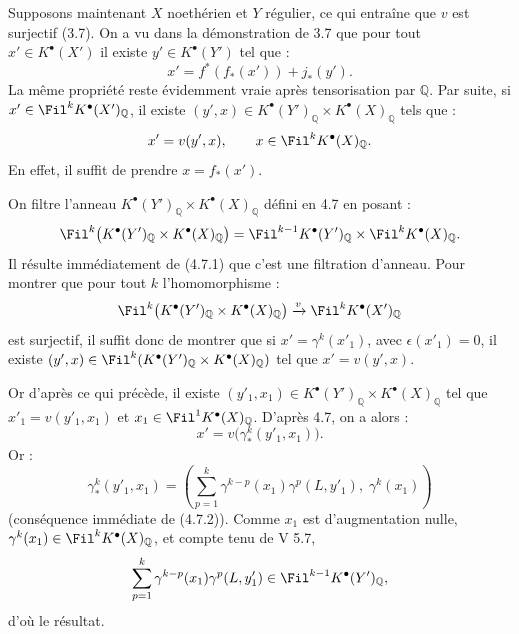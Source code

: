 
Supposons maintenant \(X\) noethérien et \(Y\) régulier, ce qui entraîne que \(v\) est surjectif (3.7). On a vu dans la démonstration de 3.7 que pour tout \(x'\in K^{\bullet}(X')\) il existe \(y'\in K^{\bullet}(Y')\) tel que :
\[
  x'=f^*(f_*(x'))+j_*(y').
\]
La même propriété reste évidemment vraie après tensorisation par \(\mathbb Q\). Par suite, si \(x'\in\Fil^kK^{\bullet}(X')_{\mathbb Q}\), il existe \((y',x)\in K^{\bullet}(Y')_{\mathbb Q}\times K^{\bullet}(X)_{\mathbb Q}\) tels que :
\[
  x'=v(y',x),\qquad x\in\Fil^kK^{\bullet}(X)_{\mathbb Q}.
\]
En effet, il suffit de prendre \(x=f_*(x')\).

On filtre l'anneau \(K^{\bullet}(Y')_{\mathbb Q}\times K^{\bullet}(X)_{\mathbb Q}\) défini en 4.7 en posant :
\[
  \Fil^k\bigl(K^{\bullet}(Y')_{\mathbb Q}\times K^{\bullet}(X)_{\mathbb Q}\bigr)
  =
  \Fil^{k-1}K^{\bullet}(Y')_{\mathbb Q}\times \Fil^kK^{\bullet}(X)_{\mathbb Q}.
\]
Il résulte immédiatement de (4.7.1) que c'est une filtration d'anneau. Pour montrer que pour tout \(k\) l'homomorphisme :
\[
  \Fil^k\bigl(K^{\bullet}(Y')_{\mathbb Q}\times K^{\bullet}(X)_{\mathbb Q}\bigr)
  \xrightarrow{v}
  \Fil^kK^{\bullet}(X')_{\mathbb Q}
\]
est surjectif, il suffit donc de montrer que si \(x'= \gamma^k(x'_1)\), avec \(\epsilon(x'_1)=0\), il existe \((y',x)\in\Fil^k(K^{\bullet}(Y')_{\mathbb Q}\times K^{\bullet}(X)_{\mathbb Q})\) tel que \(x'=v(y',x)\).

Or d'après ce qui précède, il existe \((y'_1,x_1)\in K^{\bullet}(Y')_{\mathbb Q}\times K^{\bullet}(X)_{\mathbb Q}\) tel que \(x'_1=v(y'_1,x_1)\) et \(x_1\in\Fil^1K^{\bullet}(X)_{\mathbb Q}\). D'après 4.7, on a alors :
\[
  x'=v\bigl(\gamma^k_*(y'_1,x_1)\bigr).
\]
Or :
\[
  \gamma^k_*(y'_1,x_1)
  =
  \left(\sum_{p=1}^{k}\gamma^{k-p}(x_1)\gamma^p(L,y'_1),\;
  \gamma^k(x_1)\right)
\]
(conséquence immédiate de (4.7.2)). Comme \(x_1\) est d'augmentation nulle, \(\gamma^k(x_1)\in\Fil^kK^{\bullet}(X)_{\mathbb Q}\), et compte tenu de V 5.7,
\[
  \sum_{p=1}^{k}\gamma^{k-p}(x_1)\gamma^p(L,y'_1)
  \in\Fil^{k-1}K^{\bullet}(Y')_{\mathbb Q},
\]
d'où le résultat.


